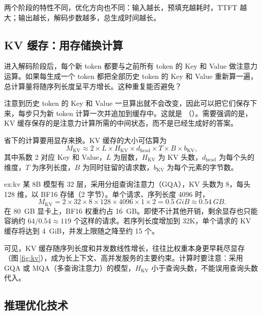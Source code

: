

两个阶段的特性不同，优化方向也不同：输入越长，预填充越耗时，TTFT 越大；输出越长，解码步数越多，总生成时间越长。

\subsection{KV 缓存：用存储换计算}
\label{subsec:kvcache}

进入解码阶段后，每个新 token 都要与之前所有 token 的 Key 和 Value 做注意力运算。如果每生成一个 token 都把全部历史 token 的 Key 和 Value 重新算一遍，总计算量将随序列长度呈平方增长。这种重复能否避免？

注意到历史 token 的 Key 和 Value 一旦算出就不会改变，因此可以把它们保存下来，每步只为新 token 计算一次并追加到缓存中。这就是 （）。需要强调的是，KV 缓存保存的是注意力计算所需的中间状态，而不是已经生成好的答案。

省下的计算要用显存来换。KV 缓存的大小可估算为
\begin{equation}
  M_{\mathrm{KV}} \approx 2 \times L \times H_{\mathrm{KV}} \times d_{\mathrm{head}} \times T \times B \times b_{\mathrm{KV}},
  \label{eq:kv}
\end{equation}
其中系数 2 对应 Key 和 Value，$L$ 为层数，$H_{\mathrm{KV}}$ 为 KV 头数，$d_{\mathrm{head}}$ 为每个头的维度，$T$ 为序列长度，$B$ 为同时驻留的请求数，$b_{\mathrm{KV}}$ 为每个元素的字节数。

\begin{example}[KV 缓存与并发上限]{ex:kv}
某 8B 模型有 32 层，采用分组查询注意力（GQA），KV 头数为 8，每头 128 维，以 BF16 存储（2 字节）。单个请求、序列长度 4096 时，
\[
  M_{\mathrm{KV}} = 2\times32\times8\times128\times4096\times1\times2 = \SI{0.5}{GiB} \approx \SI{0.54}{GB}.
\]
在 \SI{80}{GB} 显卡上，BF16 权重约占 \SI{16}{GB}。即使不计其他开销，剩余显存也只能容纳约 $64/0.54\approx 119$ 个这样的请求。若序列长度增加到 32K，单个请求的 KV 缓存将达到 \SI{4}{GiB}，并发上限随之降至约 15 个。
\end{example}

可见，KV 缓存随序列长度和并发数线性增长，往往比权重本身更早耗尽显存（图\,\ref{fig:kv}），成为长上下文、高并发服务的主要约束。计算时要注意：采用 GQA 或 MQA（多查询注意力）的模型，$H_{\mathrm{KV}}$ 小于查询头数，不能误用查询头数代入。



\subsection{推理优化技术}
\label{subsec:infer-opt}

